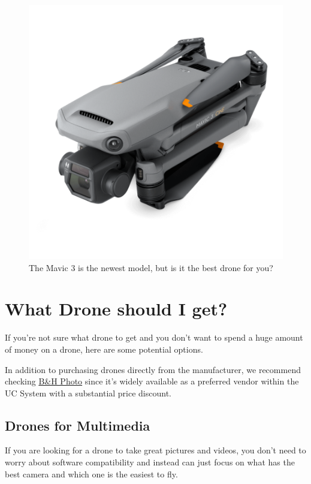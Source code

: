\documentclass[
  12pt,
]{book}
\begin{document}
\begin{figure}

{\centering \includegraphics[width=0.75\linewidth]{images/mavic3} 

}

\caption{The Mavic 3 is the newest model, but is it the best drone for you?}\label{fig:drone3}
\end{figure}

\hypertarget{what-drone-should-i-get}{%
\section{What Drone should I get?}\label{what-drone-should-i-get}}

If you're not sure what drone to get and you don't want to spend a huge amount of money on a drone, here are some potential options.

In addition to purchasing drones directly from the manufacturer, we recommend checking \href{https://www.bhphotovideo.com/}{B\&H Photo} since it's widely available as a preferred vendor within the UC System with a substantial price discount.

\hypertarget{drones-for-multimedia}{%
\subsection{Drones for Multimedia}\label{drones-for-multimedia}}

If you are looking for a drone to take great pictures and videos, you don't need to worry about software compatibility and instead can just focus on what has the best camera and which one is the easiest to fly.
\end{document}
